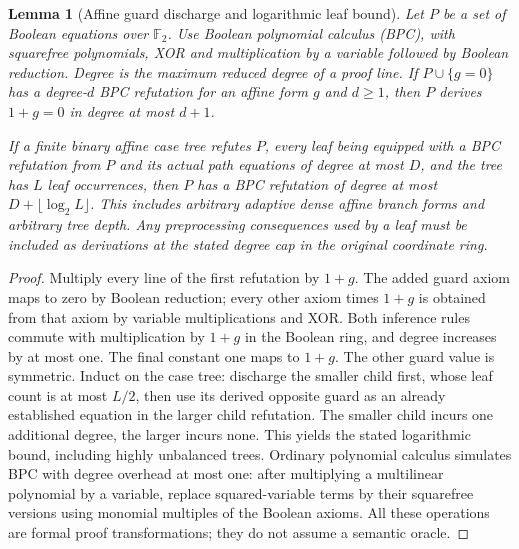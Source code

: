 \documentclass[11pt]{article}
\newtheorem{lemma}[theorem]{Lemma}
\begin{document}
\begin{lemma}[Affine guard discharge and logarithmic leaf bound]\label{lem:da16-discharge}
Let $P$ be a set of Boolean equations over $\mathbb F_2$. Use Boolean polynomial calculus (BPC), with squarefree polynomials, XOR and multiplication by a variable followed by Boolean reduction. Degree is the maximum reduced degree of a proof line. If $P\cup\{g=0\}$ has a degree-$d$ BPC refutation for an affine form $g$ and $d\ge1$, then $P$ derives $1+g=0$ in degree at most $d+1$.

If a finite binary affine case tree refutes $P$, every leaf being equipped with a BPC refutation from $P$ and its actual path equations of degree at most $D$, and the tree has $L$ leaf occurrences, then $P$ has a BPC refutation of degree at most $D+\lfloor\log_2 L\rfloor$. This includes arbitrary adaptive dense affine branch forms and arbitrary tree depth. Any preprocessing consequences used by a leaf must be included as derivations at the stated degree cap in the original coordinate ring.
\end{lemma}
\begin{proof}
Multiply every line of the first refutation by $1+g$. The added guard axiom maps to zero by Boolean reduction; every other axiom times $1+g$ is obtained from that axiom by variable multiplications and XOR. Both inference rules commute with multiplication by $1+g$ in the Boolean ring, and degree increases by at most one. The final constant one maps to $1+g$. The other guard value is symmetric. Induct on the case tree: discharge the smaller child first, whose leaf count is at most $L/2$, then use its derived opposite guard as an already established equation in the larger child refutation. The smaller child incurs one additional degree, the larger incurs none. This yields the stated logarithmic bound, including highly unbalanced trees. Ordinary polynomial calculus simulates BPC with degree overhead at most one: after multiplying a multilinear polynomial by a variable, replace squared-variable terms by their squarefree versions using monomial multiples of the Boolean axioms. All these operations are formal proof transformations; they do not assume a semantic oracle.
\end{proof}
\end{document}
